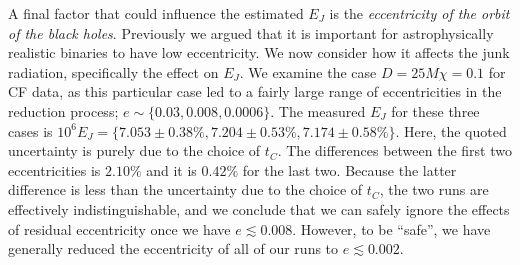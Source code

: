 A final factor that could influence the estimated $E_J$ is the
{\it eccentricity of the orbit of the black holes}. Previously we argued
that it is important for astrophysically realistic binaries to have
low eccentricity. We now consider how it affects the junk radiation, specifically the effect on $E_J$. We examine the case $D=25M \chi=0.1$
for CF data, as this particular case led to a fairly large range of
eccentricities in the reduction process;
$e\sim\{0.03,0.008,0.0006\}$. The measured $E_J$ for these three cases
is $10^6E_J=\{7.053\pm0.38\%, 7.204\pm0.53\%, 7.174\pm0.58\%\}$. Here,
the quoted uncertainty is purely due to the choice of $t_C$. The
differences between the first two eccentricities is $2.10\%$ and it is
$0.42\%$ for the last two. Because the latter difference is less than
the uncertainty due to the choice of $t_C$, the two runs are
effectively indistinguishable, and we conclude that we can safely
ignore the effects of residual eccentricity once we have $e\lesssim
0.008$. However, to be ``safe'', we have generally reduced the
eccentricity of all of our runs to $e\lesssim 0.002$.

